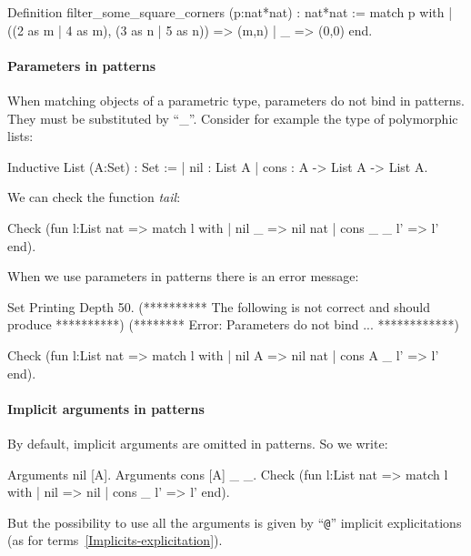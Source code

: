 \begin{coq_example}
Definition filter_some_square_corners (p:nat*nat) : nat*nat :=
  match p with
  | ((2 as m | 4 as m), (3 as n | 5 as n)) => (m,n)
  | _ => (0,0)
  end.
\end{coq_example}

\paragraph{Parameters in patterns}
When matching objects of a parametric type, parameters do not bind in patterns.
They must be substituted by ``\_''.
Consider for example the type of polymorphic lists:

\begin{coq_example}
Inductive List (A:Set) : Set :=
  | nil : List A
  | cons : A -> List A -> List A.
\end{coq_example}

We can check the function {\em tail}:

\begin{coq_example}
Check
  (fun l:List nat =>
     match l with
     | nil _ => nil nat
     | cons _ _ l' => l'
     end).
\end{coq_example}


When we use parameters in patterns there is an error message:
\begin{coq_eval}
Set Printing Depth 50.
(********** The following is not correct and should produce **********)
(******** Error: Parameters do not bind ... ************)
\end{coq_eval}
\begin{coq_example}
Check
  (fun l:List nat =>
     match l with
     | nil A => nil nat
     | cons A _ l' => l'
     end).
\end{coq_example}

\paragraph{Implicit arguments in patterns}
By default, implicit arguments are omitted in patterns. So we write:

\begin{coq_example}
Arguments nil [A].
Arguments cons [A] _ _.
Check
  (fun l:List nat =>
     match l with
     | nil => nil
     | cons _ l' => l'
     end).
\end{coq_example}

But the possibility to use all the arguments is given by ``{\tt @}'' implicit
explicitations (as for terms~\ref{Implicits-explicitation}).

